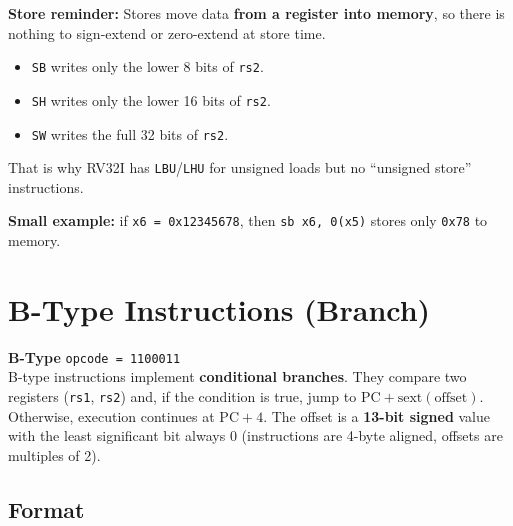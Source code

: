 \documentclass[12pt, a4paper, oneside]{book}
\begin{document}
\begin{keybox}
\textbf{\color{gold}Store reminder:}
Stores move data \textbf{from a register into memory}, so there is nothing to sign-extend or zero-extend at store time.

\begin{itemize}
  \item \texttt{SB} writes only the lower 8 bits of \texttt{rs2}.
  \item \texttt{SH} writes only the lower 16 bits of \texttt{rs2}.
  \item \texttt{SW} writes the full 32 bits of \texttt{rs2}.
\end{itemize}

That is why RV32I has \texttt{LBU}/\texttt{LHU} for unsigned loads but no ``unsigned store'' instructions.

\textbf{Small example:} if \texttt{x6 = 0x12345678}, then \texttt{sb x6, 0(x5)} stores only \texttt{0x78} to memory.
\end{keybox}

\newpage

\section{B-Type Instructions (Branch)}

\begin{infobox}
\textbf{\color{btypecolor}\Large B-Type} \hfill \texttt{opcode = 1100011}\\[6pt]
B-type instructions implement \textbf{conditional branches}. They compare two registers (\texttt{rs1}, \texttt{rs2}) and, if the condition is true, jump to $\text{PC} + \text{sext}(\text{offset})$. Otherwise, execution continues at $\text{PC} + 4$. The offset is a \textbf{13-bit signed} value with the least significant bit always 0 (instructions are 4-byte aligned, offsets are multiples of 2).
\end{infobox}

\subsection{Format}
\end{document}
